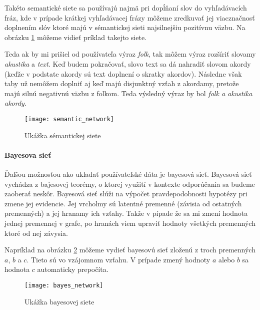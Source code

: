 Takéto semantické siete sa používajú najmä pri dopĺňaní slov do vyhľadávacích fráz,
kde v prípade krátkej vyhľadávacej frázy môžeme zredkuvať jej viacznačnosť doplnením
slóv ktoré majú v sémantickej sieti najsilnejšiu pozitívnu väzbu.
Na obrázku \ref{fig:semantic_network} môžeme vidieť príklad takejto siete.

Teda ak by mi prišiel od používateľa výraz \textit{folk}, tak môžem výraz rozšíriť slovamy
\textit{akustika} a \textit{text}. Keď budem pokračovať, slovo text sa dá nahradiť slovom
akordy (keďže v podstate akordy sú text doplnení o skratky akordov). Následne však taby už
nemôžem doplniť aj keď majú disjunktný vzťah z akordamy, pretože majú silnú negativnú 
väzbu z folkom. Teda výsledný výraz by bol \textit{folk a akustika akordy}.

\begin{figure}
    \begin{center}
        \texttt{[image: semantic\_network]}
        \caption{Ukážka sémantickej siete}
        \label{fig:semantic_network}
    \end{center}
\end{figure}

\paragraph{Bayesova sieť}

Ďaľšou možnosťou ako ukladať používateľské dáta je bayesová sieť. Bayesová sieť vychádza z 
bajesovej teorémy, o ktorej využití v kontexte odporúčania sa budeme zaoberať neskôr.
Bayesová sieť slúži na výpočet pravdepodobnosti hypotézy pri zmene jej evidencie.
Jej vrcholmy sú latentné premenné (závisia od ostatných premenných) a jej hranamy ich vzťahy.
Takže v pípade že sa mi zmení hodnota jednej premennej v grafe, po hranách viem upraviť hodnoty 
všetkých premenných ktoré od nej závysia.

Napríklad na obrázku \ref{fig:bayes_network} môžeme vydieť bayesovú sieť zloženú z troch 
premenných \(a\), \(b\) a \(c\). Tieto sú vo vzájomnom vzťahu. V prípade zmený hodnoty \(a\)
alebo \(b\) sa hodnota \(c\) automaticky prepočíta.

\begin{figure}
    \begin{center}
        \texttt{[image: bayes\_network]}
        \caption{Ukážka bayesovej siete}
        \label{fig:bayes_network}
    \end{center}
\end{figure}

